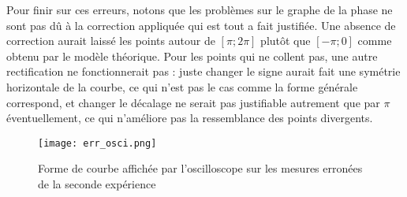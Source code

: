 Pour finir sur ces erreurs, notons que les problèmes sur le graphe de la phase ne sont pas dû à la correction appliquée qui est tout a fait justifiée. Une absence de correction aurait laissé les points autour de $[\pi;2\pi]$ plutôt que $[-\pi;0]$ comme obtenu par le modèle théorique. Pour les points qui ne collent pas, une autre rectification ne fonctionnerait pas : juste changer le signe aurait fait une symétrie horizontale de la courbe, ce qui n'est pas le cas comme la forme générale correspond, et changer le décalage ne serait pas justifiable autrement que par $\pi$ éventuellement, ce qui n'améliore pas la ressemblance des points divergents.

\begin{figure}[H]
\centering
\texttt{[image: err\_osci.png]}
\caption{Forme de courbe affichée par l'oscilloscope sur les mesures erronées de la seconde expérience}
\label{fig:mes-err}
\end{figure}